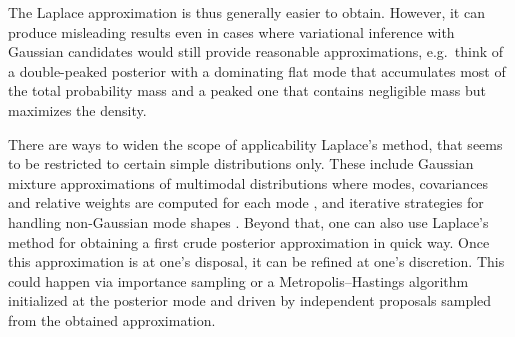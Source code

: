 The Laplace approximation is thus generally easier to obtain.
However, it can produce misleading results even in cases where variational inference with Gaussian candidates would still provide reasonable approximations,
e.g.\ think of a double-peaked posterior with a dominating flat mode that accumulates most of the total probability mass and a peaked one that contains negligible mass but maximizes the density.
\par %
There are ways to widen the scope of applicability Laplace's method, that seems to be restricted to certain simple distributions only.
These include Gaussian mixture approximations of multimodal distributions where modes, covariances and relative weights are computed for each mode \cite{Bayesian:He2016:b},
and iterative strategies for handling non-Gaussian mode shapes \cite{Bayesian:Bornkamp2011}.
Beyond that, one can also use Laplace's method for obtaining a first crude posterior approximation in quick way.
Once this approximation is at one's disposal, it can be refined at one's discretion.
This could happen via importance sampling or a Metropolis--Hastings algorithm initialized at the posterior mode and driven by independent proposals sampled from the obtained approximation.

